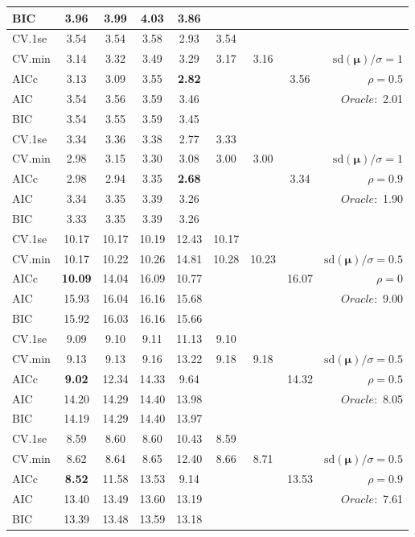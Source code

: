 \begin{table}
\begin{center}
\begin{tabular}{l*{7}{c}|r}
BIC & 3.96 & 3.99 & 4.03 & 3.86 & & & &  \\
 \hline 
CV.1se & 3.54 & 3.54 & 3.58 & 2.93 & 3.54 & & & \\
CV.min & 3.14 & 3.32 & 3.49 & 3.29 & 3.17 & 3.16 & & $\mathrm{sd}(\mathbf{\mu})/\sigma=1$ \\
AICc & 3.13 & 3.09 & 3.55 & {\bf 2.82} & & & 3.56 &  $\rho=0.5$ \\
AIC & 3.54 & 3.56 & 3.59 & 3.46 & & & &  \multirow{2}{*}{$Oracle: $ 2.01} \\
BIC & 3.54 & 3.55 & 3.59 & 3.45 & & & &  \\
 \hline 
CV.1se & 3.34 & 3.36 & 3.38 & 2.77 & 3.33 & & & \\
CV.min & 2.98 & 3.15 & 3.30 & 3.08 & 3.00 & 3.00 & & $\mathrm{sd}(\mathbf{\mu})/\sigma=1$ \\
AICc & 2.98 & 2.94 & 3.35 & {\bf 2.68} & & & 3.34 &  $\rho=0.9$ \\
AIC & 3.34 & 3.35 & 3.39 & 3.26 & & & &  \multirow{2}{*}{$Oracle: $ 1.90} \\
BIC & 3.33 & 3.35 & 3.39 & 3.26 & & & &  \\
 \hline 
CV.1se & 10.17 & 10.17 & 10.19 & 12.43 & 10.17 & & & \\
CV.min & 10.17 & 10.22 & 10.26 & 14.81 & 10.28 & 10.23 & & $\mathrm{sd}(\mathbf{\mu})/\sigma=0.5$ \\
AICc & {\bf 10.09} & 14.04 & 16.09 & 10.77 & & & 16.07 &  $\rho=0$ \\
AIC & 15.93 & 16.04 & 16.16 & 15.68 & & & &  \multirow{2}{*}{$Oracle: $ 9.00} \\
BIC & 15.92 & 16.03 & 16.16 & 15.66 & & & &  \\
 \hline 
CV.1se & 9.09 & 9.10 & 9.11 & 11.13 & 9.10 & & & \\
CV.min & 9.13 & 9.13 & 9.16 & 13.22 & 9.18 & 9.18 & & $\mathrm{sd}(\mathbf{\mu})/\sigma=0.5$ \\
AICc & {\bf 9.02} & 12.34 & 14.33 & 9.64 & & & 14.32 &  $\rho=0.5$ \\
AIC & 14.20 & 14.29 & 14.40 & 13.98 & & & &  \multirow{2}{*}{$Oracle: $ 8.05} \\
BIC & 14.19 & 14.29 & 14.40 & 13.97 & & & &  \\
 \hline 
CV.1se & 8.59 & 8.60 & 8.60 & 10.43 & 8.59 & & & \\
CV.min & 8.62 & 8.64 & 8.65 & 12.40 & 8.66 & 8.71 & & $\mathrm{sd}(\mathbf{\mu})/\sigma=0.5$ \\
AICc & {\bf 8.52} & 11.58 & 13.53 & 9.14 & & & 13.53 &  $\rho=0.9$ \\
AIC & 13.40 & 13.49 & 13.60 & 13.19 & & & &  \multirow{2}{*}{$Oracle: $ 7.61} \\
BIC & 13.39 & 13.48 & 13.59 & 13.18 & & & &  \\
 \hline 
\end{tabular}
\end{center}
\vspace{-1cm}
\end{table}





